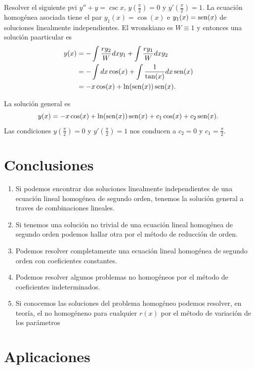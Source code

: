 \begin{ejemplo} Resolver el siguiente pvi $y''+y=\csc x$,
$y\left(\tfrac{\pi}{2}\right)=0$ y $y'\left(\tfrac{\pi}{2}\right)=1$.
La ecuación homogénea asociada tiene el par $y_1(x)=\cos(x)$ e $y_1(x)=\operatorname{sen}(x)$
   de soluciones linealmente independientes.   El wronskiano es $W\equiv 1$ y
entonces una solución paarticular es
\[\begin{split}
  y(x)&=-\int \frac{ry_2}{W}dx y_1 +\int \frac{ry_1}{W}dx y_2\\
       &=-\int dx \cos(x)+\int \frac{1}{\tan(x)}dx \operatorname{sen}(x)\\
       &=-x\cos(x) +\ln(\operatorname{sen}(x))\operatorname{sen}(x).
 \end{split}
\]

 La solución general es
 \[
  y(x)=-x\cos(x) +\ln(\operatorname{sen}(x))\operatorname{sen}(x)+c_1\cos(x)+c_2\operatorname{sen}(x).
  \]
Las condiciones $y\left(\tfrac{\pi}{2}\right)=0$ y
$y'\left(\tfrac{\pi}{2}\right)=1$ nos conducen a $c_2=0$ y $c_1=\frac{\pi}{2}$.



\end{ejemplo}
\section{Conclusiones}

\begin{enumerate}
\item Si podemos encontrar dos soluciones linealmente independientes de una ecuación lineal homogénea de segundo orden, tenemos la solución general a traves de
combinaciones lineales.
\item Si tenemos una solución no trivial de una ecuación lineal homogénea de segundo orden podemos hallar otra por el método de reducción de orden.
\item Podemos resolver completamente una ecuación lineal homogénea de segundo orden con coeficientes constantes.
\item Podemos resolver algunos problemas no homogéneos por el método de coeficientes indeterminados.
\item Si conocemos las soluciones del problema homogéneo podemos resolver, en teoría, el no homogéneno para cualquier $r(x)$ por el método de variación
de los parámetros
\end{enumerate}

\section{Aplicaciones}

